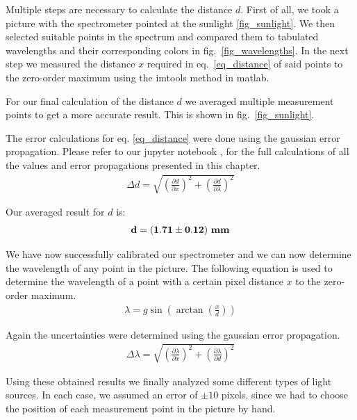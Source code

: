 Multiple steps are necessary to calculate the distance $d$.
First of all, we took a picture with the spectrometer pointed at the sunlight \ref{fig_sunlight}. We then selected suitable 
points in the spectrum and compared them to tabulated wavelengths and their corresponding colors 
in fig.~\ref{fig_wavelengths}. In the next step we measured the distance $x$ required in eq.~\ref{eq_distance} of said points to the zero-order maximum
using the imtools method in matlab.

For our final calculation of the distance $d$ we averaged multiple measurement points to get a more
accurate result. This is shown in fig.~\ref{fig_sunlight}.

The error calculations for eq. \ref{eq_distance} were done using the gaussian error propagation.
Please refer to our jupyter notebook \cite{GitHub}, for the full calculations of all the values and 
error propagations presented in this chapter. 
\begin{align}
    \Delta d = \sqrt{\left(\frac{\partial d}{\partial x}\right)^2 + \left(\frac{\partial d}{\partial \lambda}\right)^2}
\end{align}

Our averaged result for $d$ is:
\begin{align}
    \bf d = (1.71 \pm 0.12) ~\si{\bf\milli\meter} \label{res_d}
\end{align}

We have now successfully calibrated our spectrometer and we can now determine the wavelength
of any point in the picture.
The following equation is used to determine the wavelength of a point with a certain pixel 
distance $x$ to the zero-order maximum.
\begin{align}
    \lambda = g \sin\left(\arctan\left(\frac{x}{d}\right)\right) \label{eq_lambda}
\end{align}

Again the uncertainties were determined using the gaussian error propagation.
\begin{align}
    \Delta \lambda = \sqrt{\left(\frac{\partial \lambda}{\partial x}\right)^2 + \left(\frac{\partial \lambda}{\partial d}\right)^2}
\end{align}

Using these obtained results we finally analyzed some different types of light
sources. In each case, we assumed an error of $\pm 10$ pixels, since we had to choose the position of each measurement point in the picture by hand.

\newpage

